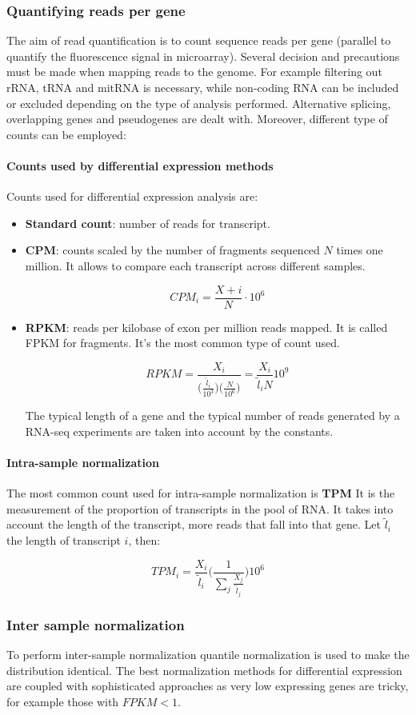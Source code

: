 		\subsubsection{Quantifying reads per gene}
		The aim of read quantification is to count sequence reads per gene (parallel to quantify the fluorescence signal in microarray).
		Several decision and precautions must be made when mapping reads to the genome.
		For example filtering out rRNA, tRNA and mitRNA is necessary, while non-coding RNA can be included or excluded depending on the type of analysis performed.
		Alternative splicing, overlapping genes and pseudogenes are dealt with.
		Moreover, different type of counts can be employed:

			\paragraph{Counts used by differential expression methods}
			Counts used for differential expression analysis are:

			\begin{itemize}
				\item \textbf{Standard count}: number of reads for transcript.
				\item \textbf{CPM}: counts scaled by the number of fragments sequenced $N$ times one million.
					It allows to compare each transcript across different samples.

					$$CPM_i = \frac{X+i}{N}\cdot 10^6$$

				\item \textbf{RPKM}: reads per kilobase of exon per million reads mapped.
					It is called FPKM for fragments.
					It's the most common type of count used.


					$$RPKM = \frac{X_i}{\big(\frac{\tilde{l}_i}{10^3}\big)\big(\frac{N}{10^6}\big)} = \frac{X_i}{\tilde{l}_iN}10^9$$

					The typical length of a gene and the typical number of reads generated by a RNA-seq experiments are taken into account by the constants.
			\end{itemize}

			\paragraph{Intra-sample normalization}
			The most common count used for intra-sample normalization is \textbf{TPM}
			It is the measurement of the proportion of transcripts in the pool of RNA.
			It takes into account the length of the transcript, more reads that fall into that gene.
			Let $\tilde{l}_i$ the length of transcript $i$, then:

			$$TPM_i = \frac{X_i}{\tilde{l}_i}\biggl(\frac{1}{\sum\limits_j\frac{X_j}{\tilde{l}_j}}\biggr)10^6$$

		\subsubsection{Inter sample normalization}
		To perform inter-sample normalization quantile normalization is used to make the distribution identical.
		The best normalization methods for differential expression are coupled with sophisticated approaches as very low expressing genes are tricky, for example those with $FPKM<1$.
